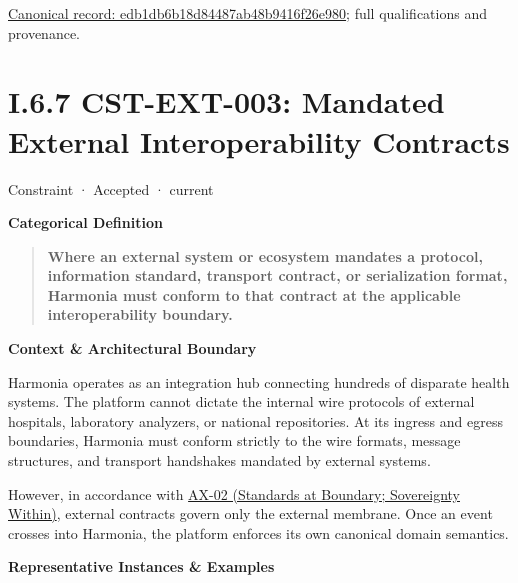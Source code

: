 {\footnotesize \href{../../../../../../../continuum/motivation/constraint/edb1db6b18d84487ab48b9416f26e980.md}{Canonical record: edb1db6b18d84487ab48b9416f26e980}; full qualifications and provenance.}\par
\section*{I.6.7 CST-EXT-003: Mandated External Interoperability Contracts}
\label{navigation:I.6.7}

\label{element:cad6d41364ef4bb1ae0a2a519db11da4}
{\small Constraint · Accepted · current}\par

\par\medskip\textbf{Categorical Definition}\par


\begin{quote}


\textbf{Where an external system or ecosystem mandates a protocol, information standard, transport contract, or serialization format, Harmonia must conform to that contract at the applicable interoperability boundary.}



\end{quote}


\par\medskip\textbf{Context \& Architectural Boundary}\par


Harmonia operates as an integration hub connecting hundreds of disparate health systems. The platform cannot dictate the internal wire protocols of external hospitals, laboratory analyzers, or national repositories. At its ingress and egress boundaries, Harmonia must conform strictly to the wire formats, message structures, and transport handshakes mandated by external systems.



However, in accordance with \hyperref[element:eee8c3783d964d18a7f9dcea85fcd4cf]{AX-02 (Standards at Boundary; Sovereignty Within)}, external contracts govern only the external membrane. Once an event crosses into Harmonia, the platform enforces its own canonical domain semantics.



\par\medskip\textbf{Representative Instances \& Examples}\par


